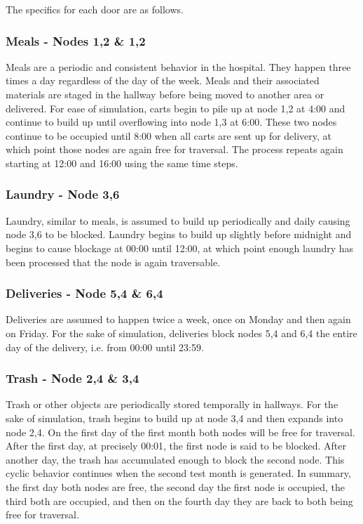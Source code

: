   The specifics for each door are as follows.

  \subsubsection{ Meals - Nodes 1,2 \& 1,2}

  Meals are a periodic and consistent behavior in the hospital. They happen
  three times a day regardless of the day of the week. Meals and their
  associated materials are staged in the hallway before being moved to
  another area or delivered. For ease of simulation, carts begin to pile up
  at node 1,2 at 4:00 and continue to build up until overflowing into node 1,3
  at 6:00. These two nodes continue to be occupied until 8:00 when all carts
  are sent up for delivery, at which point those nodes are again free for traversal. The
  process repeats again starting at 12:00 and 16:00 using the same time steps.

  \subsubsection{ Laundry - Node 3,6 }

  Laundry, similar to meals, is assumed to build up periodically and daily
  causing node 3,6 to be blocked. Laundry begins to build up slightly
  before midnight and begins to cause blockage at 00:00 until 12:00, at which
  point enough laundry has been processed that the node is again traversable.

  \subsubsection{ Deliveries - Node 5,4 \& 6,4 }

  Deliveries are assumed to happen twice a week, once on Monday and then again
  on Friday. For the sake of simulation, deliveries block nodes 5,4 and 6,4
  the entire day of the delivery, i.e. from 00:00 until 23:59.

  \subsubsection{ Trash - Node 2,4 \& 3,4 }

  Trash or other objects are periodically stored temporally in hallways.
  For the sake of simulation, trash begins to build up at node 3,4
  and then expands into node 2,4. On the first day of the first month both nodes
  will be free for traversal. After the first day, at precisely 00:01, the first
  node is said to be blocked. After another day, the trash has accumulated
  enough to block the second node. This cyclic behavior continues
  when the second test month is generated. In summary, the first day both nodes
  are free, the second day the first node is occupied, the third both are
  occupied, and then on the fourth day they are back to both being free for
  traversal.


